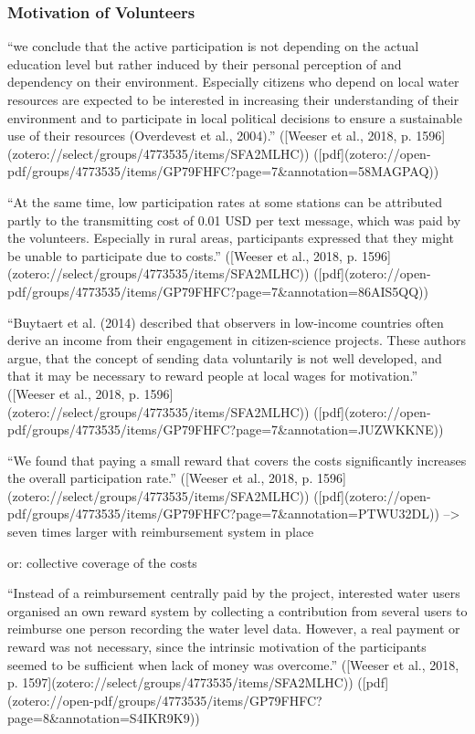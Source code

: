{%
\subsubsection{Motivation of Volunteers}

“we conclude that the active participation is not depending on the actual education level but rather induced by their personal perception of and dependency on their environment. Especially citizens who depend on local water resources are expected to be interested in increasing their understanding of their environment and to participate in local political decisions to ensure a sustainable use of their resources (Overdevest et al., 2004).” ([Weeser et al., 2018, p. 1596](zotero://select/groups/4773535/items/SFA2MLHC)) ([pdf](zotero://open-pdf/groups/4773535/items/GP79FHFC?page=7&annotation=58MAGPAQ))

“At the same time, low participation rates at some stations can be attributed partly to the transmitting cost of 0.01 USD per text message, which was paid by the volunteers. Especially in rural areas, participants expressed that they might be unable to participate due to costs.” ([Weeser et al., 2018, p. 1596](zotero://select/groups/4773535/items/SFA2MLHC)) ([pdf](zotero://open-pdf/groups/4773535/items/GP79FHFC?page=7&annotation=86AIS5QQ))

“Buytaert et al. (2014) described that observers in low-income countries often derive an income from their engagement in citizen-science projects. These authors argue, that the concept of sending data voluntarily is not well developed, and that it may be necessary to reward people at local wages for motivation.” ([Weeser et al., 2018, p. 1596](zotero://select/groups/4773535/items/SFA2MLHC)) ([pdf](zotero://open-pdf/groups/4773535/items/GP79FHFC?page=7&annotation=JUZWKKNE))

“We found that paying a small reward that covers the costs significantly increases the overall participation rate.” ([Weeser et al., 2018, p. 1596](zotero://select/groups/4773535/items/SFA2MLHC)) ([pdf](zotero://open-pdf/groups/4773535/items/GP79FHFC?page=7&annotation=PTWU32DL))
--> seven times larger with reimbursement system in place


or: collective coverage of the costs

“Instead of a reimbursement centrally paid by the project, interested water users organised an own reward system by collecting a contribution from several users to reimburse one person recording the water level data. However, a real payment or reward was not necessary, since the intrinsic motivation of the participants seemed to be sufficient when lack of money was overcome.” ([Weeser et al., 2018, p. 1597](zotero://select/groups/4773535/items/SFA2MLHC)) ([pdf](zotero://open-pdf/groups/4773535/items/GP79FHFC?page=8&annotation=S4IKR9K9))


}
